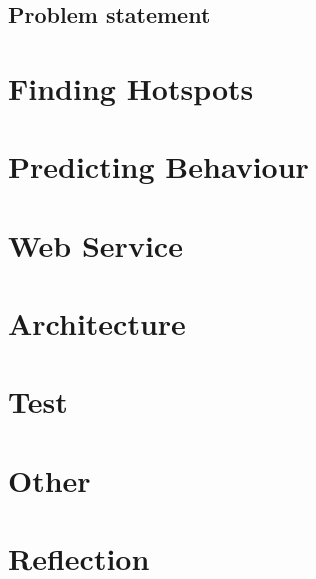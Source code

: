 \section{Problem statement}



\chapter{Finding Hotspots}





\chapter{Predicting Behaviour}




\chapter{Web Service}\label{chap:webservice}




\chapter{Architecture}





\chapter{Test}




\chapter{Other}




\chapter{Reflection}



\appendix






